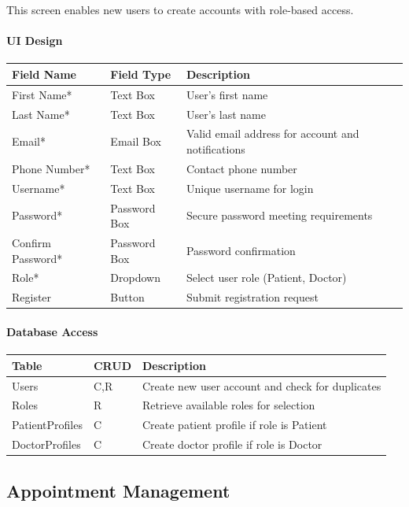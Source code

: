 \documentclass[12pt,a4paper]{article}
\begin{document}
This screen enables new users to create accounts with role-based access.

\paragraph{UI Design}

\begin{longtable}{|p{3cm}|p{3cm}|p{8cm}|}
\hline
\textbf{Field Name} & \textbf{Field Type} & \textbf{Description} \\
\hline
First Name* & Text Box & User's first name \\
\hline
Last Name* & Text Box & User's last name \\
\hline
Email* & Email Box & Valid email address for account and notifications \\
\hline
Phone Number* & Text Box & Contact phone number \\
\hline
Username* & Text Box & Unique username for login \\
\hline
Password* & Password Box & Secure password meeting requirements \\
\hline
Confirm Password* & Password Box & Password confirmation \\
\hline
Role* & Dropdown & Select user role (Patient, Doctor) \\
\hline
Register & Button & Submit registration request \\
\hline
\end{longtable}

\paragraph{Database Access}

\begin{longtable}{|p{3cm}|p{2cm}|p{9cm}|}
\hline
\textbf{Table} & \textbf{CRUD} & \textbf{Description} \\
\hline
Users & C,R & Create new user account and check for duplicates \\
\hline
Roles & R & Retrieve available roles for selection \\
\hline
PatientProfiles & C & Create patient profile if role is Patient \\
\hline
DoctorProfiles & C & Create doctor profile if role is Doctor \\
\hline
\end{longtable}

\subsection{Appointment Management}
\end{document}
